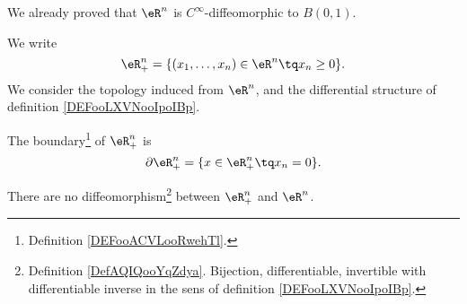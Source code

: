 We already proved that \( \eR^n\) is \( C^{\infty}\)-diffeomorphic to \( B(0,1)\).

We write
\begin{equation}
	\eR_+^n=\{ (x_1,\ldots,x_n)\in \eR^n\tq x_n\geq 0 \}.
\end{equation}
We consider the topology induced from \( \eR^n\), and the differential structure of definition \ref{DEFooLXVNooIpoIBp}.

\begin{lemma}	\label{LEMooBICBooFUQyYA}
	The boundary\footnote{Definition \ref{DEFooACVLooRwehTl}.} of \( \eR^n_+\) is
	\begin{equation}
		\partial \eR^n_+=\{ x\in \eR^n_+\tq x_n=0 \}.
	\end{equation}
\end{lemma}


\begin{proposition}	\label{PROPooPUREooSkeyxs}
	There are no diffeomorphism\footnote{Definition \ref{DefAQIQooYqZdya}. Bijection, differentiable, invertible with differentiable inverse in the sens of definition \ref{DEFooLXVNooIpoIBp}.} between \( \eR^n_+\) and \( \eR^n\).
\end{proposition}

